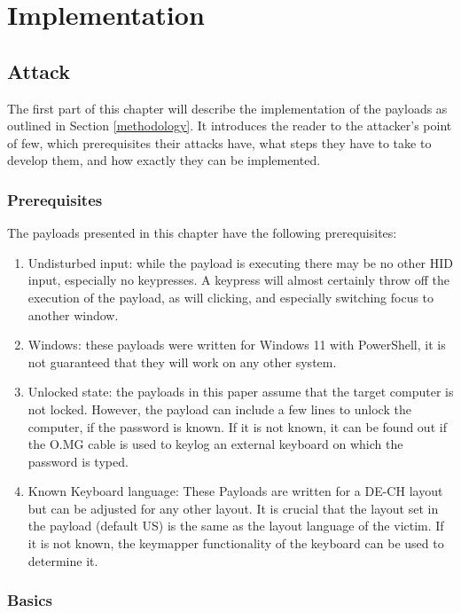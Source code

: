 \chapter{Implementation} \label{Implementation}

\section{Attack}

The first part of this chapter will describe the implementation of the payloads as outlined in Section \ref{methodology}. It introduces the reader to the attacker's point of few, which prerequisites their attacks have, what steps they have to take to develop them, and how exactly they can be implemented. 


\subsection{Prerequisites}

The payloads presented in this chapter have the following prerequisites:
\begin{enumerate}
    \item Undisturbed input: while the payload is executing there may be no other HID input, especially no keypresses. A keypress will almost certainly throw off the execution of the payload, as will clicking, and especially switching focus to another window.
    \item Windows: these payloads were written for Windows 11 with PowerShell, it is not guaranteed that they will work on any other system.
    \item Unlocked state: the payloads in this paper assume that the target computer is not locked. However, the payload can include a few lines to unlock the computer, if the password is known. If it is not known, it can be found out if the O.MG cable is used to keylog an external keyboard on which the password is typed. 
    \item Known Keyboard language: These Payloads are written for a DE-CH layout but can be adjusted for any other layout. It is crucial that the layout set in the payload (default US) is the same as the layout language of the victim. If it is not known, the keymapper functionality of the keyboard can be used to determine it. 
\end{enumerate}

\subsection{Basics}

